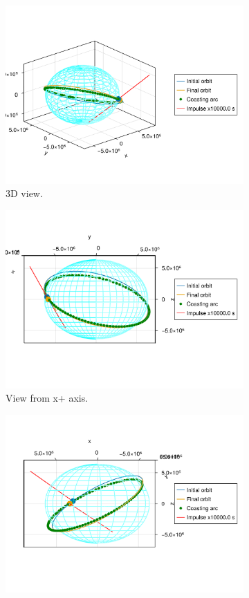 \begin{figure}[htbp]
    \centering
    \begin{subfigure}{0.49\linewidth}
        \includegraphics[width=0.8\linewidth]{../results/j2/ipv_noncop/ICI_3d.png}
        \caption{3D view.}
    \end{subfigure}
    \begin{subfigure}{0.49\linewidth}
        \includegraphics[width=0.8\linewidth]{../results/j2/ipv_noncop/ICI_x+.png}
        \caption{View from x+ axis.}
    \end{subfigure}
    \begin{subfigure}{0.49\linewidth}
        \includegraphics[width=0.8\linewidth]{../results/j2/ipv_noncop/ICI_y+.png}

\end{subfigure}
\end{figure}
